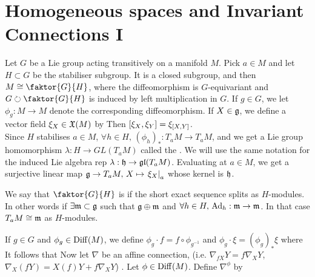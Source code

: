 \documentclass{article}
\begin{document}
\section{Homogeneous spaces and Invariant Connections I}
Let $G$ be a Lie group acting transitively on a manifold $M$. Pick $a \in M$ and let $H \subset G$ be the stabiliser subgroup. It is a closed subgroup, and then $M \cong \faktor{G}{H}$, where the diffeomorphism is $G$-equivariant and $G \lact \faktor{G}{H}$ is induced by left multiplication in $G$. If $g \in G$, we let $\phi_g : M \to M$ denote the corresponding diffeomorphism. If $X \in \mf{g}$, we define a vector field $\xi_X \in \mf{X}(M)$ by 
Then $\comm[\xi_X]{\xi_Y} = \xi_{\comm[X]{Y}}$. \\
Since $H$ stabilises $a \in M$, $\forall h \in H, \, (\phi_h)_\ast : T_aM \to T_a M$, and we get a Lie group homomorphism $\lambda : H \to GL(T_aM)$ called the . We will use the same notation for the induced Lie algebra rep $\lambda: \mf{h} \to \mf{gl}(T_aM)$. Evaluating at $a \in M$, we get a surjective linear map $\mf{g} \to T_aM, \, X \mapsto \ev{\xi_X}{a}$ whose kernel is $\mf{h}$. 

\begin{definition}
We say that $\faktor{G}{H}$ is  if the short exact sequence 
splits as $H$-modules. In other words if $\exists \mf{m} \subset \mf{g}$ such that $\mf{g} \oplus \mf{m}$ and $\forall h \in H, \, \Ad_h : \mf{m} \to \mf{m} $. In that case $T_aM \cong \mf{m}$ as $H$-modules. 
\end{definition}

If $g \in G$ and $\phi_g \in \Diff(M)$, we define $\phi_g \cdot f = f \circ \phi_{g^{-1}}$ and $\phi_g \cdot \xi = (\phi_g)_\ast \xi$ where 
It follows that 
Now let $\nabla $ be an affine connection, (i.e. $\nabla_{fX}Y = f \nabla_XY$, $\nabla_X(fY) = X(f)Y + f\nabla_X Y$) . Let $\phi \in \Diff(M)$. Define $\nabla^\phi$ by 
\end{document}
